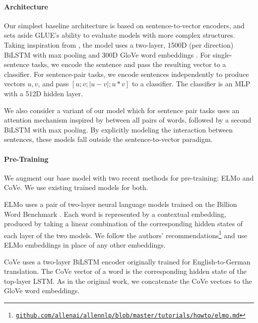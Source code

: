 \paragraph{Architecture}

Our simplest baseline architecture is based on sentence-to-vector encoders, and sets aside GLUE's ability to evaluate models with more complex structures.
Taking inspiration from \citet{DBLP:conf/emnlp/ConneauKSBB17}, the model uses a two-layer, 1500D (per direction) BiLSTM with max pooling and 300D GloVe word embeddings \citep[840B Common Crawl version;][]{pennington2014glove}.
For single-sentence tasks, we encode the sentence and pass the resulting vector to a classifier.
For sentence-pair tasks, we encode sentences independently to produce vectors $u, v$, and pass $[u; v; |u - v|; u * v]$ to a classifier.
The classifier is an MLP with a 512D hidden layer.

We also consider a variant of our model which for sentence pair tasks uses an attention mechanism inspired by \citet{seo2016bidirectional} between all pairs of words, followed by a second BiLSTM with max pooling.
By explicitly modeling the interaction between sentences, these models fall outside the sentence-to-vector paradigm.

\paragraph{Pre-Training} We augment our base model with two recent methods for pre-training: ELMo and CoVe. 
We use existing trained models for both.

ELMo uses a pair of two-layer neural language models trained on the Billion Word Benchmark \citep{chelba2013one}. 
Each word is represented by a contextual embedding, produced by taking a linear combination of the corresponding hidden states of each layer of the two models. 
We follow the authors' recommendations\footnote{\href{https://github.com/allenai/allennlp/blob/master/tutorials/how_to/elmo.md}{\tt github.com/\allowbreak allenai/\allowbreak allennlp/\allowbreak blob/\allowbreak master/\allowbreak tutorials/\allowbreak how\textunderscore to/\allowbreak elmo.md}} and use ELMo embeddings in place of any other embeddings.

CoVe \citep{mccann2017learned} uses a two-layer BiLSTM encoder originally trained for English-to-German translation. 
The CoVe vector of a word is the corresponding hidden state of the top-layer LSTM. 
As in the original work, we concatenate the CoVe vectors to the GloVe word embeddings. 

